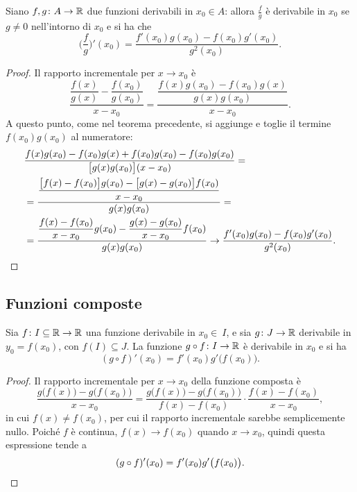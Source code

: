 \begin{teorema}
Siano $f,g\colon A\to\mathbb{R}$ due funzioni derivabili in $x_0\in A$: allora $\frac{f}{g}$ è derivabile in $x_0$ se $g\neq 0$ nell'intorno di $x_0$ e si ha che
\begin{equation}
\bigg(\frac{f}{g}\bigg)'(x_0)=\frac{f'(x_0)g(x_0)-f(x_0)g'(x_0)}{g^2(x_0)}.
\end{equation}
\end{teorema}
\begin{proof}
Il rapporto incrementale per $x\to x_0$ è
\[
\frac{\dfrac{f(x)}{g(x)}-\dfrac{f(x_0)}{g(x_0)}}{x-x_0}=\frac{\dfrac{f(x)g(x_0)-f(x_0)g(x)}{g(x)g(x_0)}}{x-x_0}.
\]
A questo punto, come nel teorema precedente, si aggiunge e toglie il termine $f(x_0)g(x_0)$ al numeratore:
\begin{align*}
&\frac{f(x)g(x_0)-f(x_0)g(x)+f(x_0)g(x_0)-f(x_0)g(x_0)}{\big[g(x)g(x_0)\big](x-x_0)}=\\
&=\frac{\dfrac{\big[f(x)-f(x_0)\big]g(x_0)-\big[g(x)-g(x_0)\big]f(x_0)}{x-x_0}}{g(x)g(x_0)}=\\
&=\frac{\dfrac{f(x)-f(x_0)}{x-x_0}g(x_0)-\dfrac{g(x)-g(x_0)}{x-x_0}f(x_0)}{g(x)g(x_0)}\to\frac{f'(x_0)g(x_0)-f(x_0)g'(x_0)}{g^2(x_0)}.\qedhere
\end{align*}
\end{proof}
\subsection{Funzioni composte}
\begin{teorema}
Sia $f\colon I\subseteq\mathbb{R}\to\mathbb{R}$ una funzione derivabile in $x_0\in\ I$, e sia $g\colon J\to\mathbb{R}$ derivabile in $y_0=f(x_0)$, con $f(I)\subseteq J$. La funzione $g\circ f\colon I\to\mathbb{R}$ è derivabile in $x_0$ e si ha
\begin{equation}
(g\circ f)'(x_0)=f'(x_0)g'\big(f(x_0)\big).
\end{equation}
\end{teorema}
\begin{proof}
Il rapporto incrementale per $x\to x_0$ della funzione composta è
\[
\frac{g\big(f(x)\big)-g\big(f(x_0)\big)}{x-x_0}=\frac{g\big(f(x)\big)-g\big(f(x_0)\big)}{f(x)-f(x_0)}\cdot\frac{f(x)-f(x_0)}{x-x_0},
\]
in cui $f(x)\neq f(x_0)$, per cui il rapporto incrementale sarebbe semplicemente nullo. Poiché $f$ è continua, $f(x)\to f(x_0)$ quando $x\to x_0$, quindi questa espressione tende a
\[
(g\circ f)'(x_0)=f'(x_0)g'\big(f(x_0)\big).\qedhere
\]
\end{proof}
